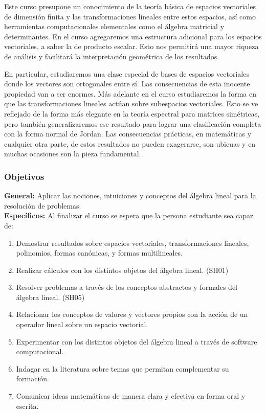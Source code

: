 \begin{refsection}
Este curso presupone un conocimiento de la teor\'ia b\'asica de espacios vectoriales
de dimensi\'on finita y las transformaciones lineales entre estos espacios, as\'i como herramientas
computacionales elementales como el \'algebra matricial y determinantes. En
el curso agregaremos una estructura adicional para los espacios vectoriales, a saber la
de producto escalar. Esto nos permitir\'a una mayor riqueza de an\'alisis y facilitar\'a la
interpretaci\'on geom\'etrica de los resultados. 

En particular, estudiaremos una clase especial de bases
de espacios vectoriales donde los vectores son ortogonales entre s\'i. Las consecuencias
de esta inocente propiedad van a ser enormes.
M\'as adelante en el curso estudiaremos la forma en que las transformaciones lineales act\'uan sobre
subespacios vectoriales. Esto se ve reflejado de la forma m\'as elegante en la teor\'ia
espectral para matrices sim\'etricas, pero tambi\'en generalizaremos ese resultado para
lograr una clasificaci\'on completa con la forma normal de Jordan. Las consecuencias
pr\'acticas, en matem\'aticas y cualquier otra parte, de estos resultados no pueden exagerarse, son ubicuas y en muchas ocasiones son la pieza fundamental.

\subsubsection*{Objetivos}

\textbf{General:} Aplicar las nociones, intuiciones y conceptos del álgebra lineal para la resolución de problemas. \\

\textbf{Específicos:} Al finalizar el curso se espera que la persona estudiante sea capaz de:

\begin{enumerate}
\item Demostrar resultados sobre espacios vectoriales, transformaciones lineales, polinomios, formas canónicas, y formas multilineales.
\item Realizar cálculos con los distintos objetos del álgebra lineal. (SH01)
\item Resolver problemas a través de los conceptos abstractos y formales del álgebra lineal. (SH05)
\item Relacionar los conceptos de valores y vectores propios con la acción de un operador lineal sobre un espacio vectorial.
\item Experimentar con los distintos objetos del álgebra lineal a través de software computacional.
\item Indagar en la literatura sobre temas que permitan complementar su formación.
\item Comunicar ideas matemáticas de manera clara y efectiva en forma oral y escrita.
\end{enumerate}


\end{refsection}
